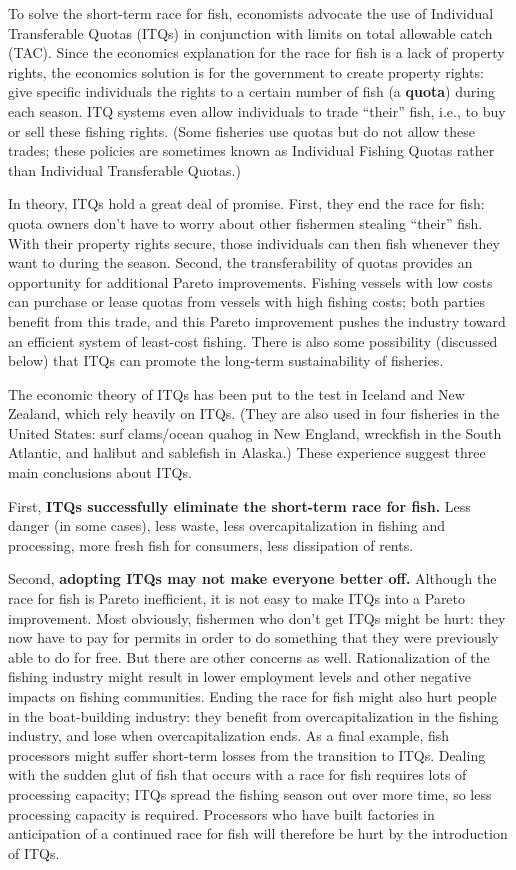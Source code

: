 To solve the short-term race for fish, economists advocate the use of Individual Transferable Quotas (ITQs) in conjunction with limits on total allowable catch (TAC). Since the economics explanation for the race for fish is a lack of property rights, the economics solution is for the government to create property rights: give specific individuals the rights to a certain number of fish (a \textbf{quota}) during each season. ITQ systems even allow individuals to trade ``their'' fish, i.e., to buy or sell these fishing rights. (Some fisheries use quotas but do not allow these trades; these policies are sometimes known as Individual Fishing Quotas rather than Individual Transferable Quotas.)

In theory, ITQs hold a great deal of promise. First, they end the race for fish: quota owners don't have to worry about other fishermen stealing ``their'' fish. With their property rights secure, those individuals can then fish whenever they want to during the season. Second, the transferability of quotas provides an opportunity for additional Pareto improvements. Fishing vessels with low costs can purchase or lease quotas from vessels with high fishing costs; both parties benefit from this trade, and this Pareto improvement pushes the industry toward an efficient system of least-cost fishing. There is also some possibility (discussed below) that ITQs can promote the long-term sustainability of fisheries.


The economic theory of ITQs has been put to the test in Iceland and New Zealand, which rely heavily on ITQs. (They are also used in four fisheries in the United States: surf clams/ocean quahog in New England, wreckfish in the South Atlantic, and halibut and sablefish in Alaska.) These experience suggest three main conclusions about ITQs.

First, \textbf{ITQs successfully eliminate the short-term race for fish.} Less danger (in some cases), less waste, less overcapitalization in fishing and processing, more fresh fish for consumers, less dissipation of rents.

Second, \textbf{adopting ITQs may not make everyone better off.} Although the race for fish is Pareto inefficient, it is not easy to make ITQs into a Pareto improvement. Most obviously, fishermen who don't get ITQs might be hurt: they now have to pay for permits in order to do something that they were previously able to do for free. But there are other concerns as well. Rationalization of the fishing industry might result in lower employment levels and other negative impacts on fishing communities. Ending the race for fish might also hurt people in the boat-building industry: they benefit from overcapitalization in the fishing industry, and lose when overcapitalization ends. As a final example, fish processors might suffer short-term losses from the transition to ITQs. Dealing with the sudden glut of fish that occurs with a race for fish requires lots of processing capacity; ITQs spread the fishing season out over more time, so less processing capacity is required. Processors who have built factories in anticipation of a continued race for fish will therefore be hurt by the introduction of ITQs.

